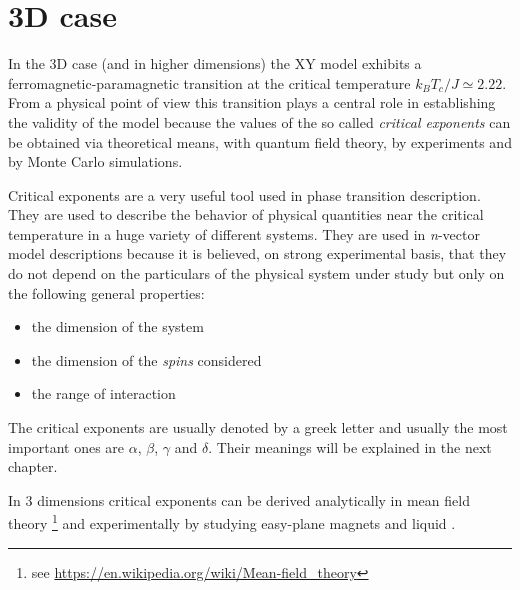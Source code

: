 \section{3D case}

In the 3D case (and in higher dimensions) the XY model exhibits a 
ferromagnetic-paramagnetic transition at the critical temperature $k_B T_c / J 
\simeq 2.22$. From a physical point of view this transition plays a central role in
establishing the validity of the model because the values of the so called 
\emph{critical exponents} can be obtained via theoretical means, with quantum
field theory, by experiments and by Monte Carlo simulations.

Critical exponents are a very useful tool used in phase transition description.
They are used to describe the behavior of physical quantities near the critical
temperature in a huge variety of different systems. They are used in 
\textit{n}-vector model descriptions because it is believed, on strong experimental 
basis, that they do not depend on the particulars of the physical system under
study but only on the following general properties:
\begin{itemize}
  \item the dimension of the system
  \item the dimension of the \emph{spins} considered
  \item the range of interaction
\end{itemize}

The critical exponents are usually denoted by a greek letter and usually the most
important ones are $\alpha$, $\beta$, $\gamma$ and $\delta$. Their meanings will
be explained in the next chapter. 
 
In 3 dimensions critical exponents can be derived analytically in mean field
theory \footnote{see \url{https://en.wikipedia.org/wiki/Mean-field_theory}}
and experimentally by studying easy-plane magnets and liquid .

